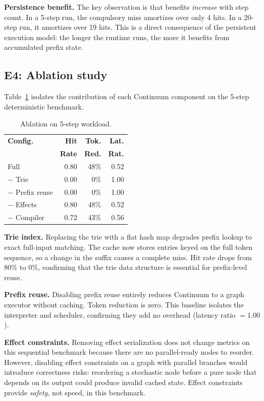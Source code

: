 \documentclass[10pt,twocolumn]{article}
\begin{document}
\textbf{Persistence benefit.} The key observation is that benefits \emph{increase} with step count. In a 5-step run, the compulsory miss amortizes over only 4 hits. In a 20-step run, it amortizes over 19 hits. This is a direct consequence of the persistent execution model: the longer the runtime runs, the more it benefits from accumulated prefix state.

\subsection{E4: Ablation study}

Table~\ref{tab:ablation-full} isolates the contribution of each Continuum component on the 5-step deterministic benchmark.

\begin{table}[t]
\centering
{\small
\caption{Ablation on 5-step workload.}
\label{tab:ablation-full}
\begin{tabular}{@{}lrrr@{}}
\toprule
\textbf{Config.} & \textbf{Hit} & \textbf{Tok.} & \textbf{Lat.} \\
 & \textbf{Rate} & \textbf{Red.} & \textbf{Rat.} \\
\midrule
Full             & 0.80 & 48\% & 0.52 \\
$-$ Trie         & 0.00 &  0\% & 1.00 \\
$-$ Prefix reuse & 0.00 &  0\% & 1.00 \\
$-$ Effects      & 0.80 & 48\% & 0.52 \\
$-$ Compiler     & 0.72 & 43\% & 0.56 \\
\bottomrule
\end{tabular}
}
\end{table}

\textbf{Trie index.} Replacing the trie with a flat hash map degrades prefix lookup to exact full-input matching. The cache now stores entries keyed on the full token sequence, so a change in the suffix causes a complete miss. Hit rate drops from 80\% to 0\%, confirming that the trie data structure is essential for prefix-level reuse.

\textbf{Prefix reuse.} Disabling prefix reuse entirely reduces Continuum to a graph executor without caching. Token reduction is zero. This baseline isolates the interpreter and scheduler, confirming they add no overhead (latency ratio $= 1.00$).

\textbf{Effect constraints.} Removing effect serialization does not change metrics on this sequential benchmark because there are no parallel-ready nodes to reorder. However, disabling effect constraints on a graph with parallel branches would introduce correctness risks: reordering a stochastic node before a pure node that depends on its output could produce invalid cached state. Effect constraints provide \emph{safety}, not speed, in this benchmark.
\end{document}

